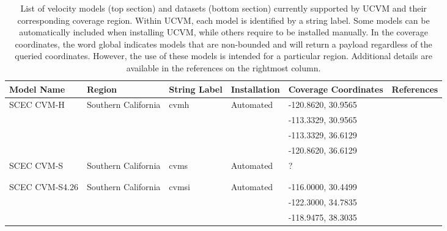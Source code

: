 
\begin{table*}[ht!]
\centering
\small
\caption{List of velocity models (top section) and datasets (bottom section) currently supported by UCVM and their corresponding coverage region. Within UCVM, each model is identified by a string label. Some models can be automatically included when installing UCVM, while others require to be installed manually. In the coverage coordinates, the word global indicates models that are non-bounded and will return a payload regardless of the queried coordinates. However, the use of these models is intended for a particular region. Additional details are available in the references on the rightmost column.}
\begin{tabular}[]{lllllp{1.25in}}
\\
Model Name         & Region                & String Label & Installation & Coverage Coordinates & References \\
\hline
SCEC CVM-H         & Southern California   & cvmh          &  Automated   & -120.8620, 30.9565 & \citet{Suss_2003_JGR}        \\
                   &                       &               &              & -113.3329, 30.9565 & \citet{Plesch_2011_SCEC}     \\
                   &                       &               &              & -113.3329, 36.6129 & \citet{CVM-H_Manual}         \\
                   &                       &               &              & -120.8620, 36.6129 &                              \\ 
SCEC CVM-S         & Southern California   & cvms          &  Automated   & ?                  & \citet{Magistrale_1996_BSSA} \\
                   &                       &               &              &                    & \citet{Magistrale_2000_BSSA} \\
                   &                       &               &              &                    & \citet{Kohler_2003_BSSA}     \\
SCEC CVM-S4.26     & Southern California   & cvmsi         &  Automated   & -116.0000, 30.4499 & \citet{Chen_2011_Proc}       \\
                   &                       &               &              & -122.3000, 34.7835 & \citet{Lee_2014_JGR}         \\
                   &                       &               &              & -118.9475, 38.3035 & \citet{Lee_2014_SRL}         \\

\end{tabular}
\end{table*}
